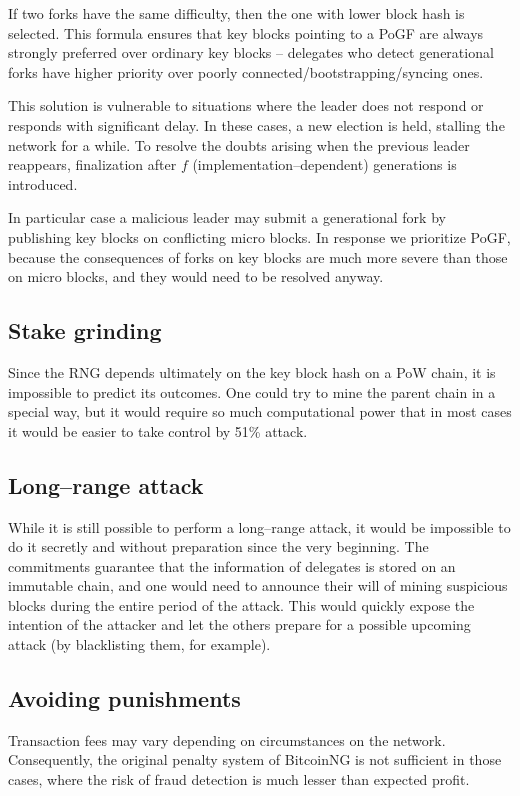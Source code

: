 If two forks have the same difficulty, then the one with lower block hash
is selected. This formula ensures that key blocks pointing to a PoGF are always
strongly preferred over ordinary key blocks – delegates who detect generational
forks have higher priority over poorly connected/bootstrapping/syncing ones.

This solution is vulnerable to situations where the leader does not respond
or responds with significant delay. In these cases, a new election is held,
stalling the network for a while. To resolve the doubts arising when the
previous leader reappears,
finalization after $f$ (implementation–dependent) generations is introduced.

In particular case a malicious leader may submit a generational
fork by publishing key blocks on conflicting micro blocks.
In response we prioritize PoGF, because the consequences of forks on
key blocks are much more severe than those on micro blocks, and they would need to
be resolved anyway.

\subsection{Stake grinding}

Since the RNG depends ultimately on the key block hash on a PoW chain, it is
impossible to predict its outcomes. One could try to mine the parent chain
in a special way, but it would require so much computational power that in
most cases it would be easier to take control by 51\% attack.

\subsection{Long–range attack}
While it is still possible to perform a long–range attack, it would be impossible to do it
secretly and without preparation since the very beginning. The commitments
guarantee that the information of delegates is stored on an immutable chain,
and one would need to announce their will of mining suspicious blocks during
the entire period of the attack. This would quickly expose the intention of the attacker
and let the others prepare for a possible upcoming attack
(by blacklisting them, for example).

\subsection{Avoiding punishments}
Transaction fees may vary depending on circumstances on the network.
Consequently, the original penalty system of BitcoinNG is not sufficient in
those cases, where the risk of fraud detection is much lesser than expected profit.


